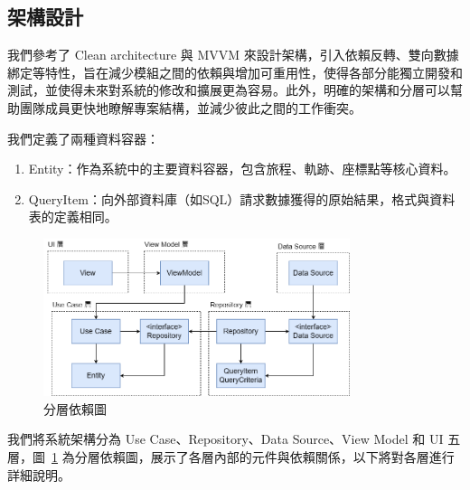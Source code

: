 


\subsection{架構設計}

我們參考了 Clean architecture 與 MVVM 來設計架構，引入依賴反轉、雙向數據綁定等特性，旨在減少模組之間的依賴與增加可重用性，使得各部分能獨立開發和測試，並使得未來對系統的修改和擴展更為容易。此外，明確的架構和分層可以幫助團隊成員更快地瞭解專案結構，並減少彼此之間的工作衝突。

我們定義了兩種資料容器：

\begin{enumerate}
    \item Entity：作為系統中的主要資料容器，包含旅程、軌跡、座標點等核心資料。
    \item QueryItem：向外部資料庫（如SQL）請求數據獲得的原始結果，格式與資料表的定義相同。
\end{enumerate}

\begin{figure}[H]
    \centering
    \includegraphics[width=0.8\textwidth]{assets/TT分層依賴圖.png}
    \caption{分層依賴圖}
    \label{分層依賴圖}
\end{figure}

我們將系統架構分為 Use Case、Repository、Data Source、View Model 和 UI 五層，圖~\ref{分層依賴圖} 為分層依賴圖，展示了各層內部的元件與依賴關係，以下將對各層進行詳細說明。

